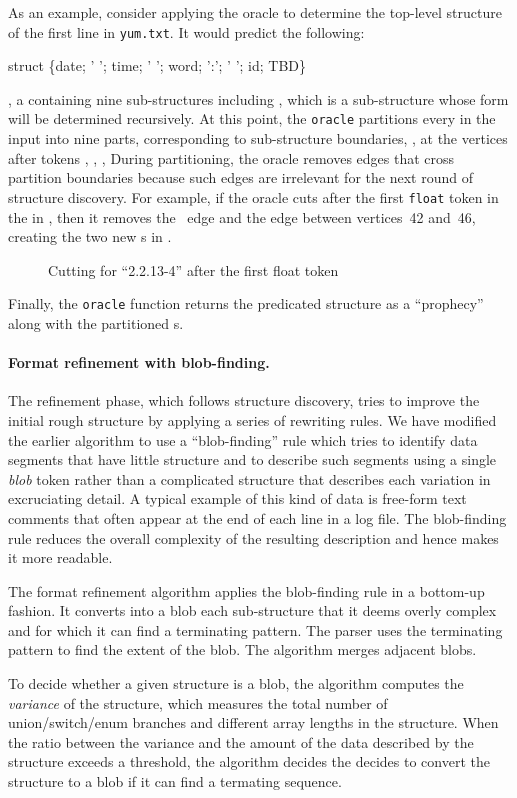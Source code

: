 As an example, consider applying the oracle to determine the top-level
structure of the first line in \texttt{yum.txt}.  It would predict the
following: 
\begin{centercode}
struct \{date;  ' '; time; ' '; word; ':'; ' '; id; TBD\}
\end{centercode}
\ie{}, a  containing nine sub-structures including , which is
a sub-structure whose form will be determined recursively.
At this point, the {\tt oracle} partitions
every \seqset{} in the input into nine parts, corresponding to
sub-structure boundaries,
\ie{}, at the vertices after tokens , , ,
\etc{}
During partitioning, the oracle removes \seqset{} edges that cross partition
boundaries because such edges are irrelevant for the next round
of structure discovery.
For example, if the oracle cuts after the first {\tt float} token in the \seqset{}
in , then it removes the ~edge and the  edge between
vertices~42 and~46, creating the two new \seqset{}s in .
%
\begin{figure}[th]
\begin{center}
\end{center}
\caption{Cutting \seqset{} for ``2.2.13-4'' after the first float token} \label{fig:cut}
\shrink
\end{figure}
%
Finally, the {\tt oracle} function returns the predicated structure as a ``prophecy''
along with the partitioned \seqset{}s. 

\paragraph*{Format refinement with blob-finding.}
The refinement phase, which follows structure discovery, tries to
improve the initial rough structure by applying a series of
rewriting rules.  We have modified the earlier algorithm to use a 
``blob-finding'' rule which tries to identify data segments that have
little structure and to describe such segments using a single
\textit{blob} token rather than a complicated structure that describes
each variation in excruciating detail.  A typical example of this kind
of data is free-form text comments that often appear at the end of
each line in a log file.  The blob-finding rule reduces the overall
complexity of the resulting description and hence makes it more
readable.

The format refinement algorithm applies the blob-finding rule 
in a bottom-up fashion. It converts into a blob each sub-structure
that it deems overly complex and for which it can find a terminating pattern. 
The \pads{} parser uses the terminating pattern to
find the extent of the blob. The algorithm merges adjacent blobs.

To decide whether a given structure is a blob, 
the algorithm computes the {\em variance} of the structure, which
measures the total number of union/switch/enum
branches and different array lengths in the 
structure. When the ratio between the variance and the amount of the data
described by the structure exceeds a threshold, the algorithm decides
the decides to convert the structure to a blob if it can find a
termating sequence.
